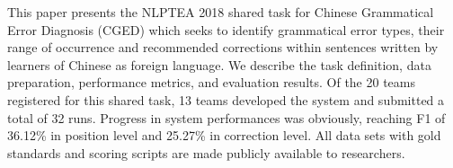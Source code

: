This paper presents the NLPTEA 2018 shared task for Chinese Grammatical Error Diagnosis (CGED) which seeks to identify grammatical error types, their range of occurrence and recommended corrections within sentences written by learners of Chinese as foreign language. We describe the task definition, data preparation, performance metrics, and evaluation results. Of the 20 teams registered for this shared task, 13 teams developed the system and submitted a total of 32 runs. Progress in system performances was obviously, reaching F1 of 36.12\% in position level and 25.27\% in correction level. All data sets with gold standards and scoring scripts are made publicly available to researchers.
